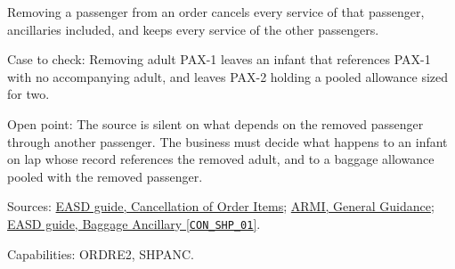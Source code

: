 \begin{theorem}
  \label{thm:ancillaries-remove-passenger}
  \notready
  Removing a passenger from an order cancels every service of that
  passenger, ancillaries included, and keeps every service of the other
  passengers.

  Case to check: Removing adult PAX-1 leaves an infant that references PAX-1
  with no accompanying adult, and leaves PAX-2 holding a pooled allowance
  sized for two.

  Open point: The source is silent on what depends on the removed passenger
  through another passenger. The business must decide what happens to an
  infant on lap whose record references the removed adult, and to a baggage
  allowance pooled with the removed passenger.

  Sources: \href{https://standards.atlassian.net/wiki/spaces/EASD/pages/574783569}{EASD guide, Cancellation of Order Items};
  \href{https://standards.atlassian.net/wiki/spaces/ARMI/pages/584318980}{ARMI, General Guidance};
  \href{https://standards.atlassian.net/wiki/spaces/EASD/pages/574423130}{EASD guide, Baggage Ancillary [\texttt{CON\_SHP\_01}]}.

  Capabilities: ORDRE2, SHPANC.
\end{theorem}
